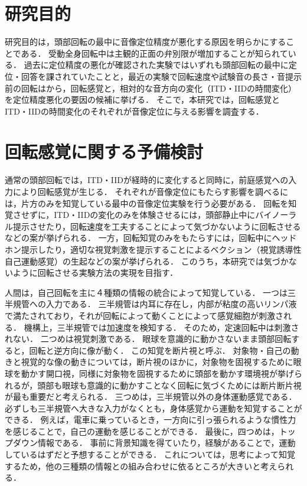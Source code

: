 \documentclass[12pt,a4j]{jsarticle}
\renewcommand{\ }{\hspace{1zw}}
\begin{document}
\section{研究目的}
研究目的は，頭部回転の最中に音像定位精度が悪化する原因を明らかにすることである．
受動全身回転中は主観的正面の弁別限が増加することが知られている．
過去に定位精度の悪化が確認された実験ではいずれも頭部回転の最中に定位・回答を課されていたことと，最近の実験で回転速度や試験音の長さ・音提示前の回転はから，回転感覚と，相対的な音方向の変化（ITD・IIDの時間変化）を定位精度悪化の要因の候補に挙げる．
そこで，本研究では，回転感覚とITD・IIDの時間変化のそれぞれが音像定位に与える影響を調査する．

\section{回転感覚に関する予備検討}
\ 通常の頭部回転では，ITD・IIDが経時的に変化すると同時に，前庭感覚への入力により回転感覚が生じる．
それぞれが音像定位にもたらす影響を調べるには，片方のみを知覚している最中の音像定位実験を行う必要がある．
回転を知覚させずに，ITD・IIDの変化のみを体験させるには，頭部静止中にバイノーラル提示させたり，回転速度を工夫することによって気づかないように回転させるなどの案が挙げられる．
一方，回転知覚のみをもたらすには，回転中にヘッドホン提示したり，適切な視覚刺激を提示することによるベクション（視覚誘導性自己運動感覚）の生起などの案が挙げられる．
このうち，本研究では気づかないように回転させる実験方法の実現を目指す．

\ 人間は，自己回転を主に４種類の情報の統合によって知覚している．
一つは三半規管への入力である．
三半規管は内耳に存在し，内部が粘度の高いリンパ液で満たされており，それが回転によって動くことによって感覚細胞が刺激される．
機構上，三半規管では加速度を検知する．
そのため，定速回転中は刺激されない．
二つめは視覚刺激である．
眼球を意識的に動かさないまま頭部回転すると，回転と逆方向に像が動く．
この知覚を断片視と呼ぶ．
対象物・自己の動きと視覚的な像の動きについては，断片視のほかに，対象物を固視するために眼球を動かす開口視，同様に対象物を固視するために頭部を動かす環境視が挙げられるが，頭部も眼球も意識的に動かすことなく回転に気づくためには断片断片視が最も重要だと考えられる．
三つめは，三半規管以外の身体運動感覚である．
必ずしも三半規管へ大きな入力がなくとも，身体感覚から運動を知覚することができる．
例えば，電車に乗っているとき，一方向に引っ張られるような慣性力を感じることで，自己の運動を感じることができる．
最後に，四つめは，トップダウン情報である．
事前に背景知識を得ていたり，経験があることで，運動しているはずだと予想することができる．
これについては，思考によって知覚するため，他の三種類の情報との組み合わせに依るところが大きいと考えられる．
\end{document}
